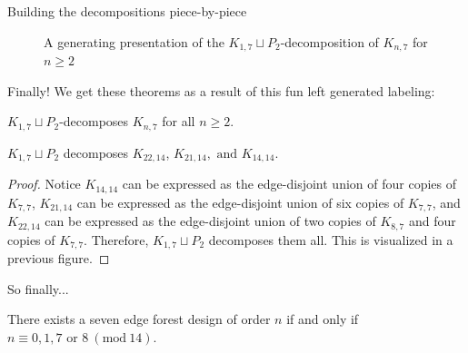 \documentclass[xcolor=x11names,compress,8pt]{beamer}
\theoremstyle{plain}
\newcommand{\Mod}[1]{\ (\mathrm{mod}\ #1)}
\begin{document}
\begin{frame}{Building the decompositions piece-by-piece}
\begin{figure}
\begin{center}
\end{center}
\caption{A generating presentation of the $K_{1,7}\sqcup P_{2}$-decomposition of $K_{n,7}$ for $n\geq 2$}
\end{figure}
\end{frame}

\begin{frame}{Finally!}
We get these theorems as a result of this fun left generated labeling:

\begin{theorem}
$K_{1,7}\sqcup P_{2}$-decomposes $K_{n,7}$ for all $n\geq 2$.
\end{theorem}

\begin{theorem}
$K_{1,7}\sqcup P_{2}$ decomposes $K_{22,14}$, $K_{21,14},\text{ and }K_{14,14}$.
\end{theorem}

\begin{proof}
    Notice $K_{14,14}$ can be expressed as the edge-disjoint union of four copies of $K_{7,7}$, $K_{21,14}$ can be expressed as the edge-disjoint union of six copies of $K_{7,7}$, and $K_{22,14}$ can be expressed as the edge-disjoint union of two copies of $K_{8,7}$ and four copies of $K_{7,7}$. Therefore, $K_{1,7}\sqcup P_{2}$ decomposes them all. This is visualized in a previous figure.
\end{proof}
So finally...
\begin{theorem}
There exists a seven edge forest design of order $n$ if and only if $n\equiv 0,1,7\text{ or }8\Mod{14}$.
\end{theorem}
\end{frame}
\end{document}
